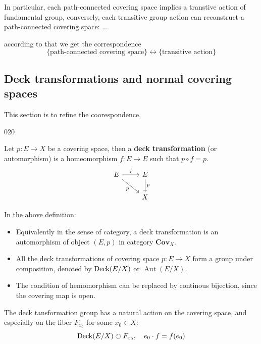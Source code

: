 In particular, each path-connected covering space implies a transtive action of fundamental group, conversely, each transitive group action can reconstruct a path-connected covering space:
...

according to that we get the correspondence
\[\{\text{path-connected covering space}\} \longleftrightarrow  \{\text{transitive action}\}\]



\subsection{Deck transformations and normal covering spaces}

This section is to refine the coorespondence, 

020

\begin{definition}
    Let \(p:E \to X\) be a covering space, then a \textbf{deck transformation} (or automorphism) is a homeomorphism \(f:E \to E\) such that \(p \circ f = p\).
\[\begin{tikzcd}
	E & E \\
	& X
	\arrow["f", from=1-1, to=1-2]
	\arrow["p"', from=1-1, to=2-2]
	\arrow["p", from=1-2, to=2-2]
\end{tikzcd}\]
\end{definition}

In the above definition:
\begin{itemize}
    \item Equivalently in the sense of category, a deck transformation is an automorphism of object \((E,p)\) in category \(\mathbf{Cov}_X\).

    \item All the deck transformations of covering space \(p:E \to X\) form a group under composition, denoted by \(\operatorname{Deck}(E/X)\) or \(\operatorname{Aut}(E/X)\).

    \item The condition of hemomorphism can be replaced by continous bijection, since the covering map is open.
\end{itemize}

The deck tansformation group has a natural action on the covering space, and especially on the fiber \(F_{x_0}\) for some \(x_0 \in X\):
\[\operatorname{Deck}(E/X) \circlearrowright F_{x_0}, \quad e_0\cdot f = f(e_0) \]

